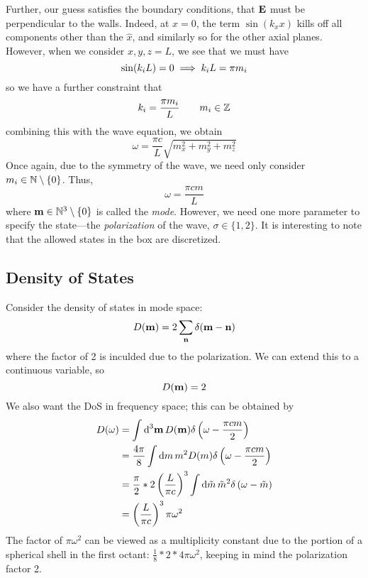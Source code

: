Further, our guess satisfies the boundary conditions, that \(\mathbf{E}\) must be perpendicular to the walls. Indeed, at \(x=0\), the term \(\sin(k_x x)\) kills off all components other than the \(\hat x\), and similarly so for the other axial planes. However, when we consider \(x,y,z = L\), we see that we must have
\[\sin(k_i L)=0\implies k_i L = \pi m_i\]
so we have a further constraint that
\[k_i = \frac{\pi m_i}{L}\qquad m_i\in \mathbb{Z}\]
combining this with the wave equation, we obtain
\[\omega = \frac{\pi c}{L}\sqrt{m_x^2+m_y^2+m_z^2}\]
Once again, due to the symmetry of the wave, we need only consider \(m_i \in \mathbb{N}\setminus\{0\}\). Thus,
\begin{equation}
	\omega = \frac{\pi c m}{L}
\end{equation}
where \(\mathbf{m}\in \mathbb{N}^3\setminus\{0\}\) is called the \emph{mode}. However, we need one more parameter to specify the state---the \emph{polarization} of the wave, \(\sigma\in\{1,2\}\). It is interesting to note that the allowed states in the box are discretized. 

\subsection{Density of States}
Consider the density of states in mode space:
\[D(\mathbf{m}) = 2\sum_{\mathbf{n}} \delta(\mathbf{m}-\mathbf{n})\]
where the factor of 2 is inculded due to the polarization. We can extend this to a continuous variable, so
\[D(\mathbf{m}) = 2\]
We also want the DoS in frequency space; this can be obtained by
\begin{align*}
	D(\omega) &= \int\d[3]{\vb m} D(\vb m) \delta\left(\omega-\frac{\pi c m}{2}\right)\\
		  &= \frac{4\pi}{8}\int\d{m} m^2D(m)\delta\left(\omega-\frac{\pi c m}{2}\right)\\
		  &= \frac{\pi}{2}*2 \left(\frac{L}{\pi c}\right)^3\int\d{\tilde m}\tilde m^2 \delta \left(\omega - \tilde m\right)\\
		  &=\left(\frac{L}{\pi c}\right)^3\pi\omega^2
\end{align*}
The factor of \(\pi\omega^2\) can be viewed as a multiplicity constant due to the portion of a spherical shell in the first octant: \(\frac{1}{8}*2*4\pi\omega^2\), keeping in mind the polarization factor 2.

